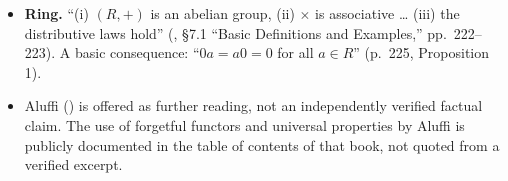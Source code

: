 \begin{itemize}
\tightlist
\item
  \textbf{Ring.} ``(i) \((R, +)\) is an abelian group, (ii) \(\times\) is associative \ldots{} (iii) the distributive laws hold'' (\cite{DummitFoote2003}, §7.1 ``Basic Definitions and Examples,'' pp.~222--223). A basic consequence: ``\(0a = a0 = 0\) for all \(a \in R\)'' (p.~225, Proposition 1).
\item
  Aluffi (\cite{Aluffi2009}) is offered as further reading, not an independently verified factual claim. The use of forgetful functors and universal properties by Aluffi is publicly documented in the table of contents of that book, not quoted from a verified excerpt.
\end{itemize}
